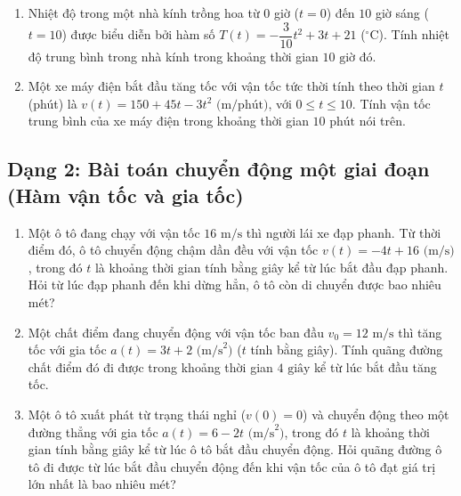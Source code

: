 \documentclass[12pt]{article}
\begin{document}
	\begin{btdo}
		\begin{enumerate}[label=\textbf{Bài \arabic*.}]
			\item Nhiệt độ trong một nhà kính trồng hoa từ $0$ giờ ($t = 0$) đến $10$ giờ sáng ($t = 10$) được biểu diễn bởi hàm số $T(t) = -\dfrac{3}{10}t^2 + 3t + 21$ ($^\circ\text{C}$). Tính nhiệt độ trung bình trong nhà kính trong khoảng thời gian $10\text{ giờ}$ đó.
			\item Một xe máy điện bắt đầu tăng tốc với vận tốc tức thời tính theo thời gian $t$ (phút) là $v(t) = 150 + 45t - 3t^2\text{ (m/phút)}$, với $0 \le t \le 10$. Tính vận tốc trung bình của xe máy điện trong khoảng thời gian $10\text{ phút}$ nói trên.
		\end{enumerate}
	\end{btdo}
	
	\subsection{Dạng 2: Bài toán chuyển động một giai đoạn (Hàm vận tốc và gia tốc)}
	\begin{btxanh}
		\begin{enumerate}[label=\textbf{Bài \arabic*.}]
			\item Một ô tô đang chạy với vận tốc $16\text{ m/s}$ thì người lái xe đạp phanh. Từ thời điểm đó, ô tô chuyển động chậm dần đều với vận tốc $v(t) = -4t + 16\text{ (m/s)}$, trong đó $t$ là khoảng thời gian tính bằng giây kể từ lúc bắt đầu đạp phanh. Hỏi từ lúc đạp phanh đến khi dừng hẳn, ô tô còn di chuyển được bao nhiêu mét?
			\item Một chất điểm đang chuyển động với vận tốc ban đầu $v_0 = 12\text{ m/s}$ thì tăng tốc với gia tốc $a(t) = 3t + 2\text{ (m/s}^2\text{)}$ ($t$ tính bằng giây). Tính quãng đường chất điểm đó đi được trong khoảng thời gian $4\text{ giây}$ kể từ lúc bắt đầu tăng tốc.
			\item Một ô tô xuất phát từ trạng thái nghỉ ($v(0) = 0$) và chuyển động theo một đường thẳng với gia tốc $a(t) = 6 - 2t\text{ (m/s}^2\text{)}$, trong đó $t$ là khoảng thời gian tính bằng giây kể từ lúc ô tô bắt đầu chuyển động. Hỏi quãng đường ô tô đi được từ lúc bắt đầu chuyển động đến khi vận tốc của ô tô đạt giá trị lớn nhất là bao nhiêu mét?
		\end{enumerate}
	\end{btxanh}
	
\end{document}
